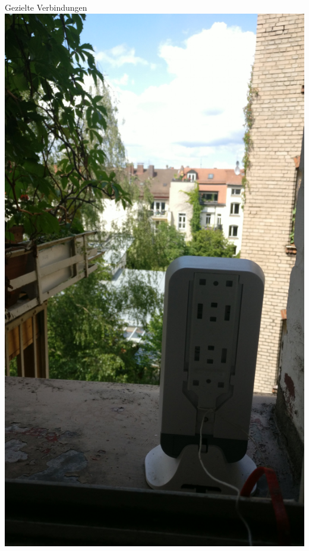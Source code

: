 \documentclass{beamer}
\begin{document}
	\begin{frame}[standout]{Gezielte Verbindungen}
		\includegraphics[height=0.9\textheight]{media/p2p-fensterbrett1.jpg}
	\end{frame}
\end{document}
